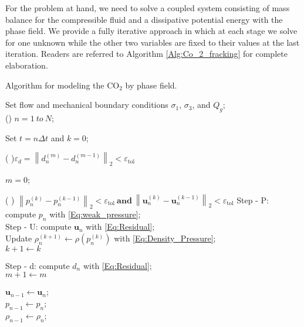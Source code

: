 For the problem at hand, we need to solve a coupled system consisting of mass balance for the compressible fluid and a dissipative potential energy with the phase field. We provide a fully iterative approach in which at each stage we solve for one unknown while the other two variables are fixed to their values at the last iteration. Readers are referred to Algorithm \ref{Alg:Co_2_fracking} for complete elaboration.

\LinesNumbered
\begin{algorithm}[htbp]
	\caption{Algorithm for modeling the CO$_2$ by phase field.} \label{Alg:Co_2_fracking}
	
	
	Set flow and mechanical boundary conditions $\sigma_1$, $\sigma_3$, and $Q_g$;\\
	
	\For()
	{ {$n= 1 ~ to~ N$};  }{Set  $t=n\Delta t$ and $k=0$; 
		
		{\Repeat( ){$\varepsilon_d=\left\| d_n^{\left( m\right) }-d_{n}^{\left( m-1\right) } \right\|_{2}  <\varepsilon_{\text{tol}}$ }
			{ 
				$m=0$; 
				
				
				
				
				{\Repeat( ){   $\left\| p_n^{\left( k\right) }-p_{n}^{\left( k-1\right) } \right\|_{2}  <\varepsilon_{\text{tol}} ~\textbf{and}~ \left\| \bm{u}_n^{\left( k\right) }-\bm{u}_{n}^{\left( k-1\right) } \right\|_{2}  <\varepsilon_{\text{tol}}$  }
					{
						Step - P: compute $p_n$ with \eqref{Eq:weak_pressure};\\
						Step - U: compute $\bm{u}_{n}$ with \eqref{Eq:Residual};\label{line:compute_u}\\
						
						
						
						Update $ \rho_n^{\left( k+1\right) } \leftarrow \rho(p_n^{\left( k\right) })$ with \eqref{Eq:Density_Pressure};\\
						
						$k+1 \leftarrow k$
					}
				}
				
				
				Step - d: compute $d_n$ with \eqref{Eq:Residual}; \\
				$m+1 \leftarrow m$
			}
		}
		
		$\bm{u}_{n-1} \leftarrow \bm{u}_n$;\\ 
		$p_{n-1} \leftarrow p_n$;\\ 
		$\rho_{n-1} \leftarrow \rho_n$;\\ 
	}
	
\end{algorithm}

